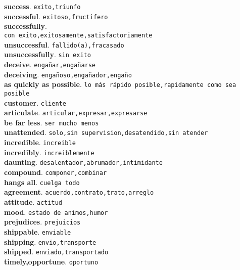 \documentclass[twocolumn]{article}
\begin{document}
	\textsf{\textbf{success}}. \texttt{exito,triunfo}\\
	\textsf{\textbf{successful}}. \texttt{exitoso,fructifero}\\
	\textsf{\textbf{successfully}}.\\ \texttt{con exito,exitosamente,satisfactoriamente}\\
    \textsf{\textbf{unsuccessful}}. \texttt{fallido(a),fracasado}\\
	\textsf{\textbf{unsuccessfully}}. \texttt{sin exito}\\
	\textsf{\textbf{deceive}}. \texttt{enga\~nar,enga\~narse}\\
	\textsf{\textbf{deceiving}}. \texttt{enga\~noso,enga\~nador,enga\~no}\\
	\textsf{\textbf{as quickly as possible}}. \texttt{lo m\'as r\'apido posible,rapidamente como sea posible}\\
	\textsf{\textbf{customer}}. \texttt{cliente}\\
	\textsf{\textbf{articulate}}. \texttt{articular,expresar,expresarse}\\
	\textsf{\textbf{be far less}}. \texttt{ser mucho menos}\\
	\textsf{\textbf{unattended}}. \texttt{solo,sin supervision,desatendido,sin atender}\\
	\textsf{\textbf{incredible}}. \texttt{increible}\\
	\textsf{\textbf{incredibly}}. \texttt{increiblemente}\\
	\textsf{\textbf{daunting}}. \texttt{desalentador,abrumador,intimidante}\\
	\textsf{\textbf{compound}}. \texttt{componer,combinar}\\
	\textsf{\textbf{hangs all}}. \texttt{cuelga todo}\\
	\textsf{\textbf{agreement}}. \texttt{acuerdo,contrato,trato,arreglo}\\
	\textsf{\textbf{attitude}}. \texttt{actitud}\\
	\textsf{\textbf{mood}}. \texttt{estado de animos,humor}\\
	\textsf{\textbf{prejudices}}. \texttt{prejuicios}\\
	\textsf{\textbf{shippable}}. \texttt{enviable}\\
	\textsf{\textbf{shipping}}. \texttt{envio,transporte}\\
	\textsf{\textbf{shipped}}. \texttt{enviado,transportado}\\
	\textsf{\textbf{timely,opportune}}. \texttt{oportuno}\\
\end{document}
